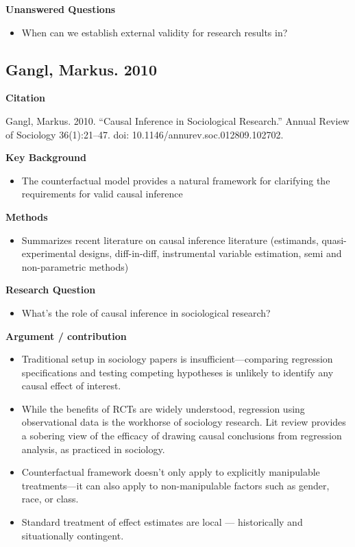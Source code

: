 \documentclass[
]{book}
\providecommand{\tightlist}{%
  \setlength{\itemsep}{0pt}\setlength{\parskip}{0pt}}
\begin{document}
\textbf{Unanswered Questions}

\begin{itemize}
\tightlist
\item
  When can we establish external validity for research results in?
\end{itemize}

\hypertarget{gangl-markus.-2010}{%
\subsection*{Gangl, Markus. 2010}\label{gangl-markus.-2010}}

\textbf{Citation}

Gangl, Markus. 2010. ``Causal Inference in Sociological Research.'' Annual Review of Sociology 36(1):21--47. doi: 10.1146/annurev.soc.012809.102702.

\textbf{Key Background}

\begin{itemize}
\tightlist
\item
  The counterfactual model provides a natural framework for clarifying the requirements for valid causal inference
\end{itemize}

\textbf{Methods}

\begin{itemize}
\tightlist
\item
  Summarizes recent literature on causal inference literature (estimands, quasi-experimental designs, diff-in-diff, instrumental variable estimation, semi and non-parametric methods)
\end{itemize}

\textbf{Research Question}

\begin{itemize}
\tightlist
\item
  What's the role of causal inference in sociological research?
\end{itemize}

\textbf{Argument / contribution}

\begin{itemize}
\tightlist
\item
  Traditional setup in sociology papers is insufficient---comparing regression specifications and testing competing hypotheses is unlikely to identify any causal effect of interest.
\item
  While the benefits of RCTs are widely understood, regression using observational data is the workhorse of sociology research. Lit review provides a sobering view of the efficacy of drawing causal conclusions from regression analysis, as practiced in sociology.
\item
  Counterfactual framework doesn't only apply to explicitly manipulable treatments---it can also apply to non-manipulable factors such as gender, race, or class.
\item
  Standard treatment of effect estimates are local --- historically and situationally contingent.
\end{itemize}
\end{document}
